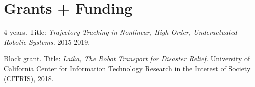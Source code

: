 \documentclass[letterpaper]{deedy-resume} %
\begin{document}

{{}
  
{}
{}


\sectionspace %


  




\section{Grants + Funding}

\vspace{0.2cm}


\begin{etaremune}

\item {} 4 years. Title: {\it Trajectory Tracking in Nonlinear, High-Order, Underactuated Robotic Systems.} 2015-2019.
  
\item{} Block grant. Title: {\it Laika, The Robot Transport for Disaster Relief.} University of California Center for Information Technology Research in the Interest of Society (CITRIS), 2018.


\end{etaremune}}
\end{document}
